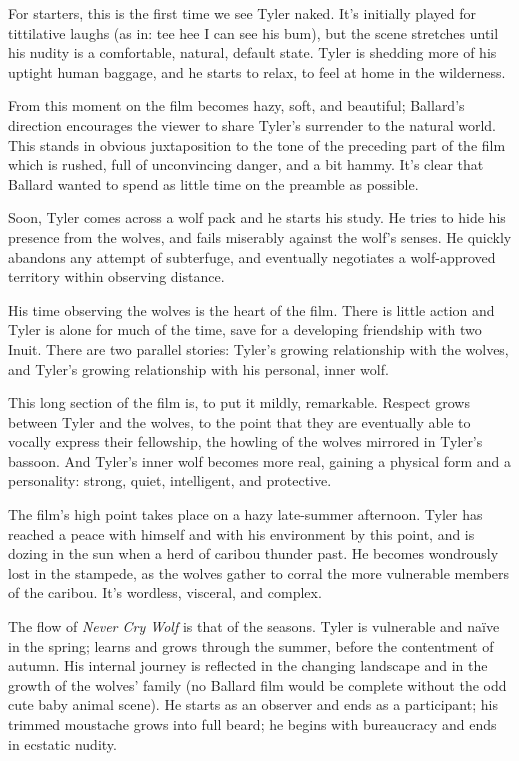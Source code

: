 For starters, this is the first time we see Tyler naked. It’s initially played for tittilative laughs (as in: tee hee I can see his bum), but the scene stretches until his nudity is a comfortable, natural, default state. Tyler is shedding more of his uptight human baggage, and he starts to relax, to feel at home in the wilderness.

From this moment on the film becomes hazy, soft, and beautiful; Ballard’s direction encourages the viewer to share Tyler’s surrender to the natural world. This stands in obvious juxtaposition to the tone of the preceding part of the film which is rushed, full of unconvincing danger, and a bit hammy. It’s clear that Ballard wanted to spend as little time on the preamble as possible.

Soon, Tyler comes across a wolf pack and he starts his study. He tries to hide his presence from the wolves, and fails miserably against the wolf’s senses. He quickly abandons any attempt of subterfuge, and eventually negotiates a wolf-approved territory within observing distance.

His time observing the wolves is the heart of the film. There is little action and Tyler is alone for much of the time, save for a developing friendship with two Inuit. There are two parallel stories: Tyler’s growing relationship with the wolves, and Tyler’s growing relationship with his personal, inner wolf.

This long section of the film is, to put it mildly, remarkable. Respect grows between Tyler and the wolves, to the point that they are eventually able to vocally express their fellowship, the howling of the wolves mirrored in Tyler’s bassoon. And Tyler’s inner wolf becomes more real, gaining a physical form and a personality: strong, quiet, intelligent, and protective.

The film’s high point takes place on a hazy late-summer afternoon. Tyler has reached a peace with himself and with his environment by this point, and is dozing in the sun when a herd of caribou thunder past. He becomes wondrously lost in the stampede, as the wolves gather to corral the more vulnerable members of the caribou. It’s wordless, visceral, and complex.

The flow of \textit{Never Cry Wolf} is that of the seasons. Tyler is vulnerable and naïve in the spring; learns and grows through the summer, before the contentment of autumn. His internal journey is reflected in the changing landscape and in the growth of the wolves’ family (no Ballard film would be complete without the odd cute baby animal scene). He starts as an observer and ends as a participant; his trimmed moustache grows into full beard; he begins with bureaucracy and ends in ecstatic nudity.

